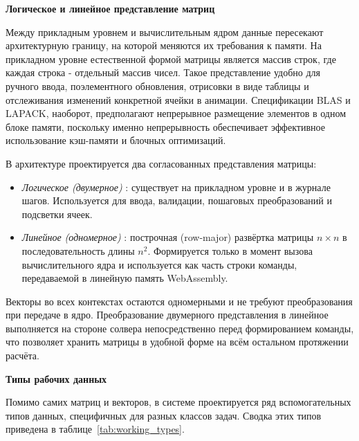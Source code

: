 \documentclass[12pt, oneside]{book}
\begin{document}
    \vspace{0.5em}

    \textbf{\large Логическое и линейное представление матриц}

    \vspace{0.5em}

    \quad Между прикладным уровнем и вычислительным ядром данные пересекают архитектурную границу, на которой меняются их требования к памяти. На прикладном уровне естественной формой матрицы является массив строк, где каждая строка - отдельный массив чисел. Такое представление удобно для ручного ввода, поэлементного обновления, отрисовки в виде таблицы и отслеживания изменений конкретной ячейки в анимации. Спецификации BLAS и LAPACK, наоборот, предполагают непрерывное размещение элементов в одном блоке памяти, поскольку именно непрерывность обеспечивает эффективное использование кэш-памяти и блочных оптимизаций.

    \quad В архитектуре проектируется два согласованных представления матрицы:

    \begin{itemize}
        \item \emph{Логическое (двумерное)} : существует на прикладном уровне и в журнале шагов. Используется для ввода, валидации, пошаговых преобразований и подсветки ячеек.
        \item \emph{Линейное (одномерное)} : построчная (row-major) развёртка матрицы $n \times n$ в  последовательность длины $n^2$. Формируется только в момент вызова вычислительного ядра и используется как часть строки команды, передаваемой в линейную память WebAssembly.
    \end{itemize}

    \quad Векторы во всех контекстах остаются одномерными и не требуют преобразования при передаче в ядро. Преобразование двумерного представления в линейное выполняется на стороне солвера непосредственно перед формированием команды, что позволяет хранить матрицы в удобной форме на всём остальном протяжении расчёта.

    \vspace{0.5em}

    \textbf{\large Типы рабочих данных}

    \vspace{0.5em}

    \quad Помимо самих матриц и векторов, в системе проектируется ряд вспомогательных типов данных, специфичных для разных классов задач. Сводка этих типов приведена в таблице~\ref{tab:working_types}.
\end{document}
